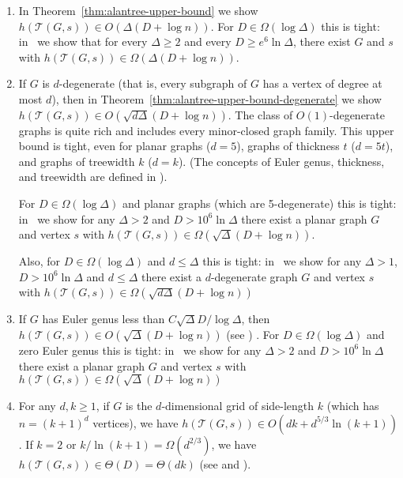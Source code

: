 \documentclass{patmorin}
\newcommand{\tcal}{\mathcal{T}}
\begin{document}

\begin{enumerate}
  \item In Theorem~\ref{thm:alantree-upper-bound} we show $h(\tcal(G,s))\in O(\Delta(D+\log n))$.
  For $D\in \Omega(\log \Delta)$ this is tight: in~ we show that for every $\Delta\ge  2$ and every $D \ge e^6\ln\Delta$, there exist $G$ and $s$ with 
   $h(\tcal(G,s))\in \Omega(\Delta(D+\log n))$.

  \item If $G$ is $d$-degenerate (that is, every subgraph of $G$ has a vertex of degree at most $d$),
  then in Theorem~\ref{thm:alantree-upper-bound-degenerate} we show  $h(\tcal(G,s))\in
    O(\sqrt{d\Delta}(D+\log n))$.  The class of $O(1)$-degenerate
    graphs is quite rich and includes every minor-closed graph family. 
  This upper bound is tight, even for planar graphs ($d=5$), graphs
  of thickness $t$ ($d=5t$), and graphs of treewidth $k$ ($d=k$).
  (The concepts of Euler genus, thickness, and treewidth
    are defined in ).

For $D\in \Omega(\log \Delta)$ and planar graphs (which are 5-degenerate) this is tight:
  in~ we show 
  for any $\Delta>2$ and $D>10^6\ln \Delta$
  there exist a planar graph $G$ and vertex $s$ with
  $h(\tcal(G,s))\in
      \Omega(\sqrt{\Delta}(D+\log n))$.
  
Also, for $D\in \Omega(\log \Delta)$ and $d\leq\Delta$ this is tight:
in~ we show 
for any $\Delta>1$, $D>10^6\ln \Delta$
and $d \leq \Delta$
there exist a $d$-degenerate graph $G$ and vertex $s$ with
$h(\tcal(G,s))\in
    \Omega(\sqrt{d\Delta}(D+\log n))$
    
  \item  If $G$ has Euler genus less than $C\sqrt{\Delta}D/\log\Delta$, then
  $h(\tcal(G,s))\in O(\sqrt{\Delta}(D+\log n))$ 
  (see )  .
  For $D\in \Omega(\log \Delta)$ and zero Euler genus this is tight:
  in~ we show 
  for any $\Delta>2$ and $D>10^6\ln \Delta$
  there exist a planar graph $G$ and vertex $s$ with
  $h(\tcal(G,s))\in
      \Omega(\sqrt{\Delta}(D+\log n))$
  

  \item For any $d,k\geq1$, if $G$ is the $d$-dimensional grid of side-length $k$ (which has
  $n=(k+1)^d$ vertices), we have $h(\tcal(G,s))\in O(dk+d^{5/3}\ln(k+1))$.
  If $k=2$ or $k/\ln(k+1)=\Omega(d^{2/3})$, we have $h(\tcal(G,s))\in \Theta(D)=\Theta(dk)$
  (see  and ).


\end{enumerate}
\end{document}

